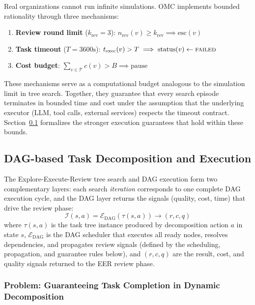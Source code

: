\documentclass[11pt,a4paper]{article}
\begin{document}
Real organizations cannot run infinite simulations. OMC implements bounded rationality through three mechanisms:
\begin{enumerate}
    \item \textbf{Review round limit} ($k_{\text{rev}} = 3$): $n_{\text{rev}}(v) \geq k_{\text{rev}} \implies \text{esc}(v)$
    \item \textbf{Task timeout} ($T = 3600\text{s}$): $t_{\text{exec}}(v) > T \implies \text{status}(v) \leftarrow \textsc{failed}$
    \item \textbf{Cost budget}: $\sum_{v \in \mathcal{T}} c(v) > B \implies \text{pause}$
\end{enumerate}
These mechanisms serve as a computational budget analogous to the simulation limit in tree search. Together, they guarantee that every search episode terminates in bounded time and cost under the assumption that the underlying executor (LLM, tool calls, external services) respects the timeout contract. Section~\ref{sec:dag} formalizes the stronger execution guarantees that hold within these bounds.


\subsection{DAG-based Task Decomposition and Execution}
\label{sec:dag}

The Explore-Execute-Review tree search and DAG execution form two complementary layers: each search \emph{iteration} corresponds to one complete DAG execution cycle, and the DAG layer returns the signals (quality, cost, time) that drive the review phase:
\begin{equation}
\mathcal{I}(s, a) = \mathcal{E}_{\text{DAG}}(\tau(s, a)) \to (r, c, q)
\end{equation}
where $\tau(s, a)$ is the task tree instance produced by decomposition action $a$ in state $s$, $\mathcal{E}_{\text{DAG}}$ is the DAG scheduler that executes all ready nodes, resolves dependencies, and propagates review signals (defined by the scheduling, propagation, and guarantee rules below), and $(r, c, q)$ are the result, cost, and quality signals returned to the EER review phase.

\subsubsection{Problem: Guaranteeing Task Completion in Dynamic Decomposition}
\end{document}
